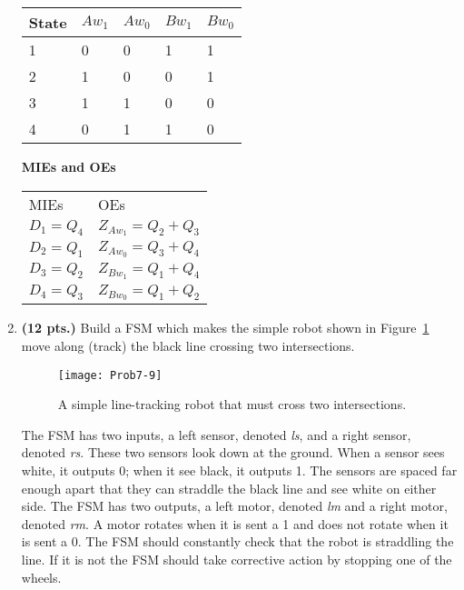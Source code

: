\begin{enumerate}
\begin{onlysolution}
{                \begin{tabular}{l|l|l|l|l}
                    State  & $Aw_1$ & $Aw_0$ & $Bw_1$ & $Bw_0$  \\ \hline
                    1    & 0    & 0     & 1      & 1        \\ \hline
                    2    & 1    & 0     & 0      & 1        \\ \hline
                    3    & 1    & 1     & 0      & 0        \\ \hline
                    4    & 0    & 1     & 1      & 0        \\
                \end{tabular}

                \textbf{ MIEs and OEs}

                \begin{tabular}{ll}
                    MIEs        &    OEs            \\
                    $D_1 = Q_4$    &    $Z_{Aw_1} = Q_2 + Q_3$    \\
                    $D_2 = Q_1$    &    $Z_{Aw_0} = Q_3 + Q_4$    \\
                    $D_3 = Q_2$    &    $Z_{Bw_1} = Q_1 + Q_4$    \\
                    $D_4 = Q_3$    &    $Z_{Bw_0} = Q_1 + Q_2$    \\
                \end{tabular}

            }
        \end{onlysolution}

    \item \textbf{ (12 pts.)}
        \label{item:robot}
        Build a FSM which makes the simple robot shown in Figure~\ref{fig:Robot}
        move along (track) the black line crossing two intersections.
        \begin{figure}[ht]
            \texttt{[image: Prob7-9]}
            \caption{A simple line-tracking robot that must cross two intersections.}
            \label{fig:Robot}
        \end{figure}

        The FSM has two inputs, a left sensor, denoted \textit{ ls}, and a right
        sensor, denoted \textit{ rs}.  These two sensors look down at the ground.
        When a sensor sees white, it outputs 0; when it see black, it outputs 1.
        The sensors are spaced far enough apart that they can straddle the black
        line and see white on either side.  The FSM has two outputs, a left
        motor, denoted \textit{ lm} and a right motor, denoted \textit{ rm}.  A motor
        rotates when it is sent a 1 and does not rotate when it is sent a 0.
        The FSM should constantly check that the robot is straddling the line.
        If it is not the FSM should take corrective action by stopping one of
        the wheels.


\end{enumerate}
